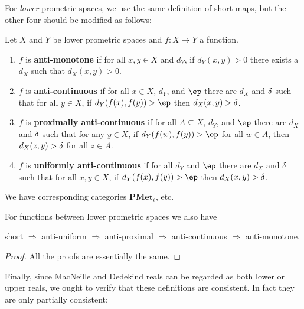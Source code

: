 \documentclass{article}
\let\implies\Rightarrow
\def\PMet{\mathbf{PMet}}
\begin{document}
For \emph{lower} prometric spaces, we use the same definition of short maps, but the other four should be modified as follows:

\begin{defn}\label{def:pmetl-maps}
  Let $X$ and $Y$ be lower prometric spaces and $f:X\to Y$ a function.
  \begin{enumerate}
  \item $f$ is \textbf{anti-monotone} if for all $x,y\in X$ and $d_Y$, if $d_Y(x,y)>0$ there exists a $d_X$ such that $d_X(x,y)>0$.
  \item $f$ is \textbf{anti-continuous} if for all $x\in X$, $d_Y$, and $\ep$ there are $d_X$ and $\delta$ such that for all $y\in X$, if $d_Y(f(x),f(y))>\ep$ then $d_X(x,y)>\delta$.
  \item $f$ is \textbf{proximally anti-continuous} if for all $A\subseteq X$, $d_Y$, and $\ep$ there are $d_X$ and $\delta$ such that for any $y\in X$, if $d_Y(f(w),f(y))>\ep$ for all $w\in A$, then $d_X(z,y)>\delta$ for all $z\in A$.
  \item $f$ is \textbf{uniformly anti-continuous} if for all $d_Y$ and $\ep$ there are $d_X$ and $\delta$ such that for all $x,y\in X$, if $d_Y(f(x),f(y))>\ep$ then $d_X(x,y)>\delta$.
  \end{enumerate}
  We have corresponding categories $\PMet_\ell$, etc.
\end{defn}

\begin{thm}
  For functions between lower prometric spaces we also have
  \begin{center}
    short $\implies$ anti-uniform $\implies$ anti-proximal $\implies$ anti-continuous $\implies$ anti-monotone.
  \end{center}
\end{thm}
\begin{proof}
  All the proofs are essentially the same.
\end{proof}

Finally, since MacNeille and Dedekind reals can be regarded as both lower or upper reals, we ought to verify that these definitions are consistent.
In fact they are only partially consistent:
\end{document}
